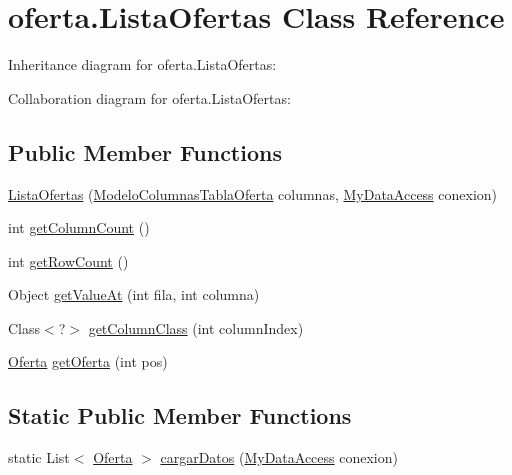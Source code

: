 \hypertarget{classoferta_1_1_lista_ofertas}{}\section{oferta.\+Lista\+Ofertas Class Reference}
\label{classoferta_1_1_lista_ofertas}


Inheritance diagram for oferta.\+Lista\+Ofertas\+:


Collaboration diagram for oferta.\+Lista\+Ofertas\+:
\subsection*{Public Member Functions}
\begin{DoxyCompactItemize}
\item 
\mbox{\hyperlink{classoferta_1_1_lista_ofertas_a2af761366b995c4ddf7cb6b1175de314}{Lista\+Ofertas}} (\mbox{\hyperlink{classoferta_1_1_modelo_columnas_tabla_oferta}{Modelo\+Columnas\+Tabla\+Oferta}} columnas, \mbox{\hyperlink{classconexion_s_q_l_1_1_my_data_access}{My\+Data\+Access}} conexion)
\item 
int \mbox{\hyperlink{classoferta_1_1_lista_ofertas_a1134f680b1eb3a296d3f0db1f5f6c708}{get\+Column\+Count}} ()
\item 
int \mbox{\hyperlink{classoferta_1_1_lista_ofertas_af98f5114e3dc3f259ec55a2ab865c1af}{get\+Row\+Count}} ()
\item 
Object \mbox{\hyperlink{classoferta_1_1_lista_ofertas_a31d3834ba593c933f612572a942fc601}{get\+Value\+At}} (int fila, int columna)
\item 
Class$<$?$>$ \mbox{\hyperlink{classoferta_1_1_lista_ofertas_a86faae91c71fe103470f039a09213048}{get\+Column\+Class}} (int column\+Index)
\item 
\mbox{\hyperlink{classoferta_1_1_oferta}{Oferta}} \mbox{\hyperlink{classoferta_1_1_lista_ofertas_aff266896ffa3bb5682ef4ecf1d514f2e}{get\+Oferta}} (int pos)
\end{DoxyCompactItemize}
\subsection*{Static Public Member Functions}
\begin{DoxyCompactItemize}
\item 
static List$<$ \mbox{\hyperlink{classoferta_1_1_oferta}{Oferta}} $>$ \mbox{\hyperlink{classoferta_1_1_lista_ofertas_a7ad03e98699edb0253f41109273e350e}{cargar\+Datos}} (\mbox{\hyperlink{classconexion_s_q_l_1_1_my_data_access}{My\+Data\+Access}} conexion)
\end{DoxyCompactItemize}


